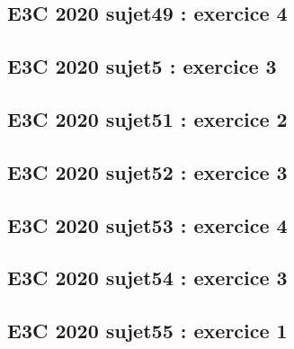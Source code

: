 \documentclass[lang=fr,edition=teacher,layout=sheet]{mxbook}
\begin{document}
\par\bigskip
{}\subsection*{E3C 2020 sujet49 : exercice 4}
\begingroup\endgroup
\par\bigskip
{}\subsection*{E3C 2020 sujet5 : exercice 3}
\begingroup\endgroup
\par\bigskip
{}\subsection*{E3C 2020 sujet51 : exercice 2}
\begingroup\endgroup
\par\bigskip
{}\subsection*{E3C 2020 sujet52 : exercice 3}
\begingroup\endgroup
\par\bigskip
{}\subsection*{E3C 2020 sujet53 : exercice 4}
\begingroup\endgroup
\par\bigskip
{}\subsection*{E3C 2020 sujet54 : exercice 3}
\begingroup\endgroup
\par\bigskip
{}\subsection*{E3C 2020 sujet55 : exercice 1}
\begingroup\endgroup
\par\bigskip
\end{document}
